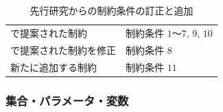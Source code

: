 \documentclass[a4paper,12pt,fleqn]{jarticle}
\begin{document}
\begin{table}[H]
  \begin{center}
    \caption{先行研究\cite{馬谷さん卒論}からの制約条件の訂正と追加}
    \begin{tabular}{ll}\hline
      \cite{馬谷さん卒論}で提案された制約 & 制約条件 $1～7$, $9$, $10$  \\
      \cite{馬谷さん卒論}で提案された制約を修正 & 制約条件 $8$  \\
      新たに追加する制約 & 制約条件 $11$  \\\hline
    \end{tabular}
    \label{制約条件表}
  \end{center}
\end{table}


\subsubsection{集合・パラメータ・変数}
\end{document}
